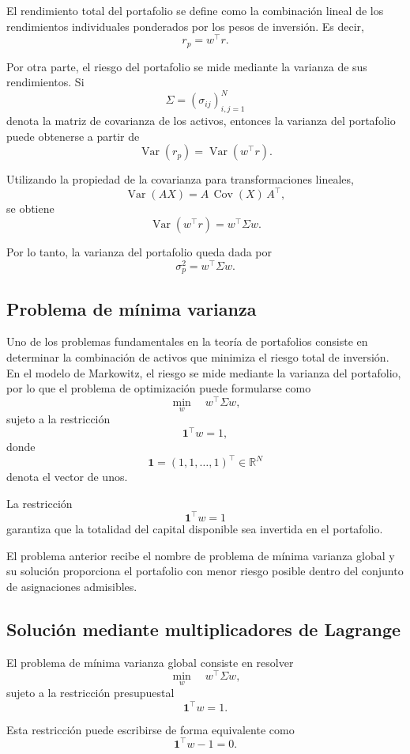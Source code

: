 \documentclass[letterpaper,12pt,oneside]{book}
\begin{document}
El rendimiento total del portafolio se define como la combinación lineal de los rendimientos individuales ponderados por los pesos de inversión. Es decir,
\[
r_p = w^\top r.
\]

Por otra parte, el riesgo del portafolio se mide mediante la varianza de sus rendimientos. Si
\[
\Sigma =
(\sigma_{ij})_{i,j=1}^N
\]
denota la matriz de covarianza de los activos, entonces la varianza del portafolio puede obtenerse a partir de
\[
\operatorname{Var}(r_p)
=
\operatorname{Var}(w^\top r).
\]

Utilizando la propiedad de la covarianza para transformaciones lineales,
\[
\operatorname{Var}(AX)
=
A\,\operatorname{Cov}(X)\,A^\top,
\]
se obtiene
\[
\operatorname{Var}(w^\top r)
=
w^\top \Sigma w.
\]

Por lo tanto, la varianza del portafolio queda dada por
\[
\sigma_p^2
=
w^\top \Sigma w.
\]

\subsection{Problema de mínima varianza}

Uno de los problemas fundamentales en la teoría de portafolios consiste en determinar la combinación de activos que minimiza el riesgo total de inversión. En el modelo de Markowitz, el riesgo se mide mediante la varianza del portafolio, por lo que el problema de optimización puede formularse como
\[
\min_w \quad w^\top \Sigma w,
\]
sujeto a la restricción
\[
\mathbf{1}^\top w = 1,
\]
donde
\[
\mathbf{1} =
(1,1,\dots,1)^\top \in \mathbb{R}^N
\]
denota el vector de unos.

La restricción
\[
\mathbf{1}^\top w = 1
\]
garantiza que la totalidad del capital disponible sea invertida en el portafolio.

El problema anterior recibe el nombre de problema de mínima varianza global y su solución proporciona el portafolio con menor riesgo posible dentro del conjunto de asignaciones admisibles.

\subsection{Solución mediante multiplicadores de Lagrange}

El problema de mínima varianza global consiste en resolver
\[
\min_w \quad w^\top \Sigma w,
\]
sujeto a la restricción presupuestal
\[
\mathbf{1}^\top w = 1.
\]

Esta restricción puede escribirse de forma equivalente como
\[
\mathbf{1}^\top w - 1 = 0.
\]
\end{document}
